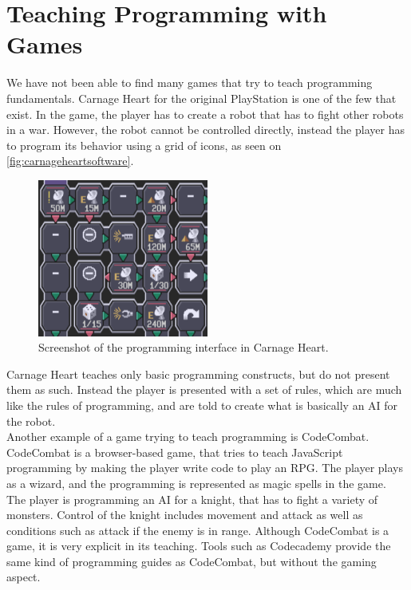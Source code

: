 \section{Teaching Programming with Games}
\label{sec:teachProgWithGames}
We have not been able to find many games that try to teach programming fundamentals. Carnage Heart for the original PlayStation is one of the few that exist. In the game, the player has to create a robot that has to fight other robots in a war. However, the robot cannot be controlled directly, instead the player has to program its behavior using a grid of icons, as seen on \autoref{fig:carnageheartsoftware}.

\begin{figure}[h]
  \centering
    \includegraphics[width=0.5\textwidth]{img/CarnageHeartSoftware.png}
  \caption{Screenshot of the programming interface in Carnage Heart.\cite{carnageheartsoftware}}
  \label{fig:carnageheartsoftware}
\end{figure}

Carnage Heart teaches only basic programming constructs, but do not present them as such. Instead the player is presented with a set of rules, which are much like the rules of programming, and are told to create what is basically an AI for the robot.\\

Another example of a game trying to teach programming is CodeCombat. \cite{codecombat} CodeCombat is a browser-based game, that tries to teach JavaScript programming by making the player write code to play an RPG. The player plays as a wizard, and the programming is represented as magic spells in the game. The player is programming an AI for a knight, that has to fight a variety of monsters. Control of the knight includes movement and attack as well as conditions such as attack if the enemy is in range.
Although CodeCombat is a game, it is very explicit in its teaching. Tools such as Codecademy provide the same kind of programming guides as CodeCombat, but without the gaming aspect.\cite{codecademy}\\

